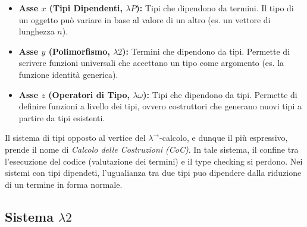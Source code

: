 \begin{itemize}
    \item \textbf{Asse $x$ (Tipi Dipendenti, \texorpdfstring{$\lambda P$}{LP}):}  
        Tipi che dipendono da termini. Il tipo di un oggetto può variare in base al valore di un altro (es. un vettore di lunghezza $n$).
    \item \textbf{Asse $y$ (Polimorfismo, \texorpdfstring{$\lambda 2$}{L2}):} 
        Termini che dipendono da tipi. Permette di scrivere funzioni universali che accettano un tipo come argomento (es. la funzione identità generica).
    \item \textbf{Asse $z$ (Operatori di Tipo, \texorpdfstring{$\lambda \underline{\omega}$}{L-omega}):}  Tipi che dipendono da tipi.
        Permette di definire funzioni a livello dei tipi, ovvero costruttori che generano nuovi tipi a partire da tipi esistenti. 
\end{itemize}
Il sistema di tipi opposto al vertice del $\lambda^{\to}$-calcolo, e dunque il più espressivo, prende il nome di \emph{Calcolo delle Costruzioni (CoC)}. 
In tale sistema, il confine tra l'esecuzione del codice (valutazione dei termini) e il type checking si perdono. Nei sistemi con tipi dipendeti, l'ugualianza 
tra due tipi puo dipendere dalla riduzione di un termine in forma normale. 

\subsection{Sistema \texorpdfstring{$\lambda 2$}{L2}}

